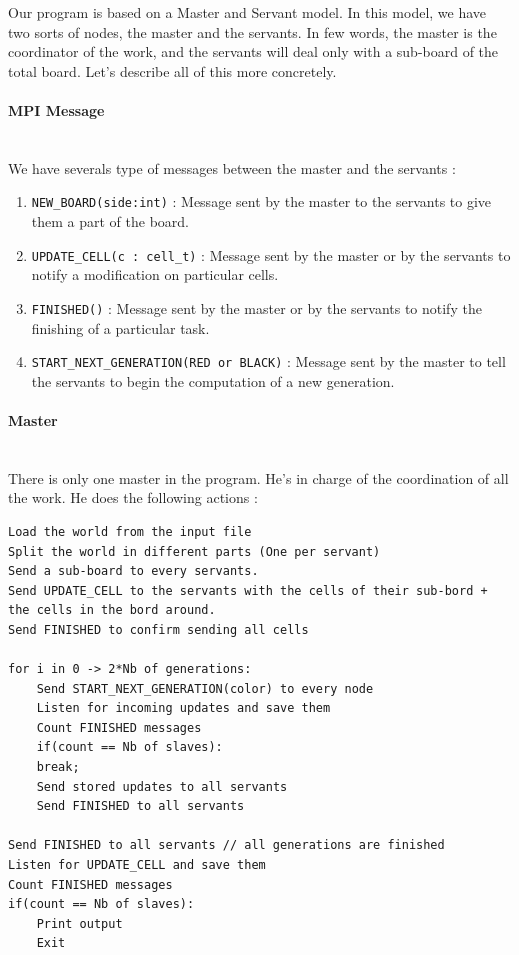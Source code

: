 \documentclass[a4paper,10pt]{article}
\begin{document}
Our program is based on a Master and Servant model.
In this model, we have two sorts of nodes, the master and the servants.
In few words, the master is the coordinator of the work, and the servants will deal only with a sub-board of the total board.
Let's describe all of this more concretely.

\paragraph{MPI Message}
~\\

We have severals type of messages between the master and the servants :

\begin{enumerate}
 \item \texttt{NEW\_BOARD(side:int)} : Message sent by the master to the servants to give them a part of the board.
 \item \texttt{UPDATE\_CELL(c : cell\_t)} : Message sent by the master or by the servants to notify a modification on particular cells.
 \item \texttt{FINISHED()} : Message sent by the master or by the servants to notify the finishing of a particular task.
 \item \texttt{START\_NEXT\_GENERATION(RED or BLACK)} : Message sent by the master to tell the servants to begin the computation
 of a new generation.
\end{enumerate}

\paragraph{Master}
~\\

There is only one master in the program. He's in charge of the coordination of all the work. He does the following actions :

\begin{lstlisting}
Load the world from the input file
Split the world in different parts (One per servant)
Send a sub-board to every servants.
Send UPDATE_CELL to the servants with the cells of their sub-bord + the cells in the bord around.
Send FINISHED to confirm sending all cells

for i in 0 -> 2*Nb of generations:
    Send START_NEXT_GENERATION(color) to every node
    Listen for incoming updates and save them
    Count FINISHED messages
    if(count == Nb of slaves):
	break;
    Send stored updates to all servants
    Send FINISHED to all servants
    
Send FINISHED to all servants // all generations are finished
Listen for UPDATE_CELL and save them
Count FINISHED messages
if(count == Nb of slaves):
    Print output
    Exit
\end{lstlisting}
\end{document}
